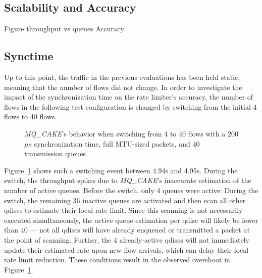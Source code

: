 \subsection{Scalability and Accuracy}
Figure throughput vs queues
Accuracy

\subsection{Synctime}
Up to this point, the traffic in the previous evaluations has been held static, meaning that the number of flows did not change.
%
In order to investigate the impact of the synchronization time on the rate limiter's accuracy, the number of flows in the following test configuration is changed by switching from the  initial 4 flows to 40 flows.
%
\begin{figure}
    \centering
    
    \caption{\textit{MQ\_CAKE}'s behavior when switching from 4 to 40 flows with a 200$\mu s$ synchronization time, full MTU-sized packets, and 40 transmission queues}\label{fig:switching_200us}
\end{figure}
%

Figure~\ref{fig:switching_200us} shows such a switching event between 4.94s and 4.95s.
%
During the switch, the throughput spikes due to \textit{MQ\_CAKE}'s inaccurate estimation of the number of active queues.
%
Before the switch, only 4 queues were active: During the switch, the remaining 36 inactive queues are activated and then scan all other qdiscs to estimate their local rate limit.
%
Since this scanning is not necessarily executed simultaneously, the active queue estimation per qdisc will likely be lower than 40 --- not all qdiscs will have already enqueued or transmitted a packet at the point of scanning.
%
Further, the 4 already-active qdiscs will not immediately update their estimated rate upon new flow arrivals, which can delay their local rate limit reduction.
%
These conditions result in the observed overshoot in Figure~\ref{fig:switching_200us}.
%

